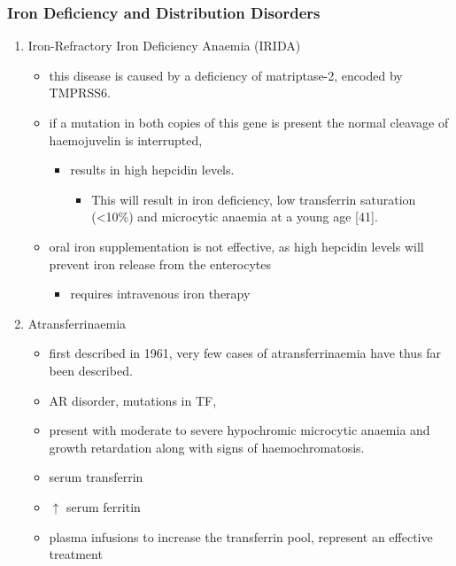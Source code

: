 \documentclass{scrartcl}
\begin{document}
\subsubsection{Iron Deficiency and Distribution Disorders}
\label{sec:org63a1ad8}
\begin{enumerate}
\item Iron-Refractory Iron Deficiency Anaemia (IRIDA)
\label{sec:org91a461c}
\begin{itemize}
\item this disease is caused by a deficiency of matriptase-2, encoded by TMPRSS6.
\item if a mutation in both copies of this gene is present the normal cleavage of haemojuvelin is interrupted,
\begin{itemize}
\item results in high hepcidin levels.
\begin{itemize}
\item This will result in iron deficiency, low transferrin saturation
(<10\%) and microcytic anaemia at a young age [41].
\end{itemize}
\end{itemize}
\item oral iron supplementation is not effective, as high hepcidin
levels will prevent iron release from the enterocytes
\begin{itemize}
\item requires intravenous iron therapy
\end{itemize}
\end{itemize}

\item Atransferrinaemia
\label{sec:org3355a8c}
\begin{itemize}
\item first described in 1961, very few cases of atransferrinaemia have thus far been described.
\item AR disorder, mutations in TF,
\item present with moderate to severe hypochromic microcytic anaemia and growth retardation along with signs of haemochromatosis.
\item \downarrown serum transferrin
\item \(\uparrow\) serum ferritin
\item plasma infusions to increase the transferrin pool, represent an
effective treatment
\end{itemize}
\end{enumerate}
\end{document}
